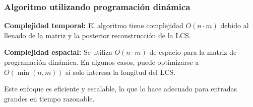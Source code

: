 \subsubsection{Algoritmo utilizando programación dinámica}

\begin{algorithm}[H]

    \footnotesize
    \DontPrintSemicolon



    \caption{Cálculo de LCS y diferencias usando programación dinámica}
    \label{alg:dp_lcs}
\end{algorithm}

\textbf{Complejidad temporal:} El algoritmo tiene complejidad $O(n \cdot m)$ debido al llenado de la matriz y la posterior reconstrucción de la LCS.

\textbf{Complejidad espacial:} Se utiliza $O(n \cdot m)$ de espacio para la matriz de programación dinámica. En algunos casos, puede optimizarse a $O(\min(n, m))$ si solo interesa la longitud del LCS.

Este enfoque es eficiente y escalable, lo que lo hace adecuado para entradas grandes en tiempo razonable.
